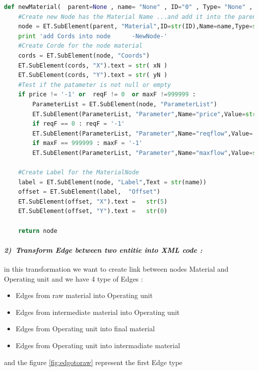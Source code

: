 \vspace{1cm}
\begin{lstlisting}[language=Python, caption=Python Function Material]
def newMaterial(  parent=None , name= "None" , ID="0" , Type= "None" , xN ='-1', yN ='-1' ,price='-1' ,reqF = 0  ,maxF =999999 ):
	#Create new Node has the Material Name ...and add it into the parent node
	node = ET.SubElement(parent, "Material",ID=str(ID),Name=name,Type=str(Type))
    print 'add Cords into node		-NewNode-'
	#Create Corde for the node material
	cords = ET.SubElement(node, "Coords")
	ET.SubElement(cords, "X").text = str( xN )
	ET.SubElement(cords, "Y").text = str( yN )
	#Test if the patameter is not null or empty
	if price != '-1' or  reqF != 0  or maxF !=999999 : 
		ParameterList = ET.SubElement(node, "ParameterList")
		ET.SubElement(ParameterList, "Parameter",Name="price",Value=str( price) )
		if reqF == 0 : reqF = '-1'
		ET.SubElement(ParameterList, "Parameter",Name="reqflow",Value= str(reqF) )
		if maxF == 999999 : maxF = '-1'
		ET.SubElement(ParameterList, "Parameter",Name="maxflow",Value=str(maxF) )

	#Create Label for the MaterialNode
	label = ET.SubElement(node, "Label",Text = str(name))
	offset = ET.SubElement(label,  "Offset")
	ET.SubElement(offset, "X").text =   str(5)
	ET.SubElement(offset, "Y").text =   str(0)
	
	return node
\end{lstlisting}

\paragraph{\emph{2)~Transform Edge between two entitie into XML code :} } in this transformation 
we want to create link between nodes Material and Operating unit 
and we have  4 type of Edges : 
\begin{itemize}
	\item Edges from raw material into Operating unit
	\item Edges from intermediate material into Operating unit
	
	\item Edges from  Operating unit into final material
	\item Edges from  Operating unit into intermadiate material 
\end{itemize}
and the figure \ref{fig:edgotoraw} represent the first Edge type 

